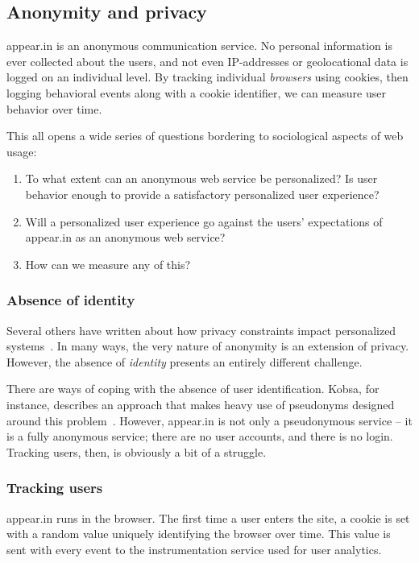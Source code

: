 \subsection{Anonymity and privacy}

appear.in is an anonymous communication service. No personal information is ever collected about the users, and not even IP-addresses or geolocational data is logged on an individual level. By tracking individual \emph{browsers} using cookies, then logging behavioral events along with a cookie identifier, we can measure user behavior over time.

This all opens a wide series of questions bordering to sociological aspects of web usage:

\begin{enumerate}
  \item
    To what extent can an anonymous web service be personalized?
    Is user behavior enough to provide a satisfactory personalized user experience?
  \item
    Will a personalized user experience go against the users' expectations of appear.in as an anonymous web service?
  \item
    How can we measure any of this?
\end{enumerate}

\subsubsection{Absence of identity} %

Several others have written about how privacy constraints impact personalized systems~\cite{Teltzrow2004,Kobsa2007}. In many ways, the very nature of anonymity is an extension of privacy. However, the absence of \emph{identity} presents an entirely different challenge.

There are ways of coping with the absence of user identification. Kobsa, for instance, describes an approach that makes heavy use of pseudonyms designed around this problem~\cite{Kobsa2003}.
However, appear.in is not only a pseudonymous service -- it is a fully anonymous service; there are no user accounts, and there is no login.
Tracking users, then, is obviously a bit of a struggle.

\subsubsection{Tracking users}

appear.in runs in the browser. The first time a user enters the site, a cookie is set with a random value uniquely identifying the browser over time. This value is sent with every event to the instrumentation service used for user analytics.

